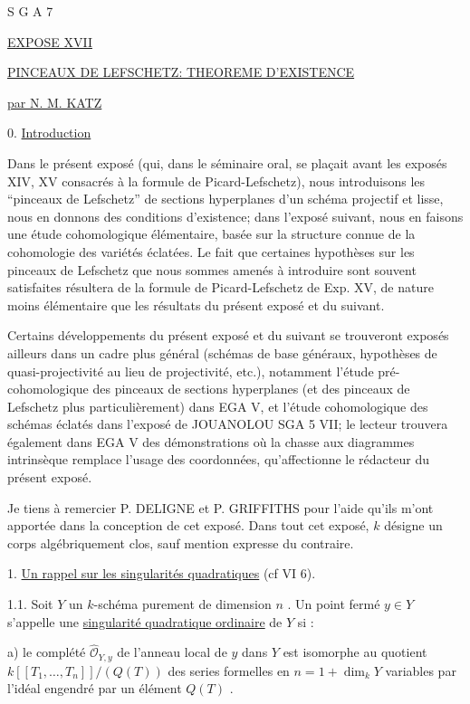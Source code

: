 


S G A 7


\underline{EXPOSE XVII}


\underline{PINCEAUX DE LEFSCHETZ: THEOREME D'EXISTENCE}


\underline{par N. M. KATZ}


0. \underline{Introduction}

Dans le présent exposé (qui, dans le séminaire oral, se plaçait avant les exposés XIV, XV consacrés à la formule de Picard-Lefschetz), nous introduisons les ``pinceaux de Lefschetz'' de sections hyperplanes d'un schéma projectif et lisse, nous en donnons des conditions d'existence; dans l'exposé suivant, nous en faisons une étude cohomologique élémentaire, basée sur la structure connue de la cohomologie des variétés éclatées. Le fait que certaines hypothèses sur les pinceaux de Lefschetz que nous sommes amenés à introduire sont souvent satisfaites résultera de la formule de Picard-Lefschetz de Exp. XV, de nature moins élémentaire que les résultats du présent exposé et du suivant.

Certains développements du présent exposé et du suivant se trouveront exposés ailleurs dans un cadre plus général (schémas de base généraux, hypothèses de quasi-projectivité au lieu de projectivité, etc.), notamment l'étude pré-cohomologique des pinceaux de sections hyperplanes (et des pinceaux de Lefschetz plus particulièrement) dans EGA V, et l'étude cohomologique des schémas éclatés dans
l'exposé de JOUANOLOU SGA 5 VII; le lecteur trouvera également dans EGA V des démonstrations où la chasse aux diagrammes intrinsèque remplace l'usage des coordonnées, qu'affectionne le rédacteur du présent exposé.

Je tiens à remercier P. DELIGNE et P. GRIFFITHS pour l'aide qu'ils m'ont apportée dans la conception de cet exposé. Dans tout cet exposé, $k$ désigne un corps algébriquement clos, sauf mention expresse du contraire.


1. \underline{Un rappel sur les singularités quadratiques} (cf VI 6).

1.1. \quad Soit $Y$ un $k$-schéma purement de dimension $n$ . Un point fermé $y \in Y$ s'appelle une \underline{singularité quadratique ordinaire} de $Y$ si :

a) le complété $\hat{\mathcal{O}}_{Y,y}$ de l'anneau local de $y$ dans $Y$ est isomorphe au quotient $k[[T_1,\ldots,T_n]]/(Q(T))$ des series formelles en $n=1+\dim_k Y$ variables par l'idéal engendré par un élément $Q(T)$ .

